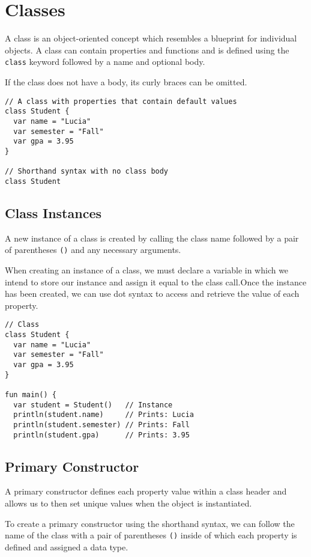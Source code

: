 \chapter{Classes}

A class is an object-oriented concept which resembles a blueprint for individual objects. 
A class can contain properties and functions and is defined using the \verb!class! keyword 
followed by a name and optional body.

If the class does not have a body, its curly braces can be omitted.

\begin{verbatim}
// A class with properties that contain default values
class Student {
  var name = "Lucia"
  var semester = "Fall"
  var gpa = 3.95
}
 
// Shorthand syntax with no class body 
class Student 
\end{verbatim}

\section{Class Instances}
A new instance of a class is created by calling the class name followed by a pair of parentheses 
\verb!()! and any necessary arguments.

When creating an instance of a class, we must declare a variable in which we intend to store our 
instance and assign it equal to the class call.Once the instance has been created, we can use dot 
syntax to access and retrieve the value of each property.

\begin{verbatim}
// Class
class Student {
  var name = "Lucia"
  var semester = "Fall"
  var gpa = 3.95
}
 
fun main() {
  var student = Student()   // Instance
  println(student.name)     // Prints: Lucia
  println(student.semester) // Prints: Fall
  println(student.gpa)      // Prints: 3.95  
\end{verbatim}

\section{Primary Constructor}
A primary constructor defines each property value within a class header and allows us to then set unique values when the object is instantiated.

To create a primary constructor using the shorthand syntax, we can follow the name of the class with a pair of parentheses \verb!()! inside of 
which each property is defined and assigned a data type.

